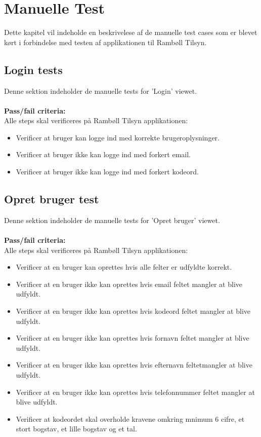 \chapter{Manuelle Test}
Dette kapitel vil indeholde en beskrivelese af de manuelle test cases som er blevet kørt i forbindelse med testen af applikationen til Rambøll Tilsyn.

\section{Login tests}
Denne sektion indeholder de manuelle tests for 'Login' viewet. \\ \\
\textbf{Pass/fail criteria:} \\
Alle steps skal verificeres på Rambøll Tilsyn applikationen:
\begin{itemize}[-]
	\item Verificer at bruger kan logge ind med korrekte brugeroplysninger.
	\item Verificer at bruger ikke kan logge ind med forkert email.
	\item Verificer at bruger ikke kan logge ind med forkert kodeord. \\
\end{itemize}

\section{Opret bruger test}
Denne sektion indeholder de manuelle tests for 'Opret bruger' viewet. \\ \\
\textbf{Pass/fail criteria:} \\
Alle steps skal verificeres på Rambøll Tilsyn applikationen:
\begin{itemize}[-]
	\item Verificer at en bruger kan oprettes hvis alle felter er udfyldte korrekt.
	\item Verificer at en bruger ikke kan oprettes hvis email feltet mangler at blive udfyldt.
	\item Verificer at en bruger ikke kan oprettes hvis kodeord feltet mangler at blive udfyldt.
	\item Verificer at en bruger ikke kan oprettes hvis fornavn feltet mangler at blive udfyldt.
	\item Verificer at en bruger ikke kan oprettes hvis efternavn feltetmangler at blive udfyldt.
	\item Verificer at en bruger ikke kan oprettes hvis telefonnummer feltet mangler at blive udfyldt.
	\item Verificer at kodeordet skal overholde kravene omkring mnimum 6 cifre, et stort bogstav, et lille bogstav og et tal.
\end{itemize}

